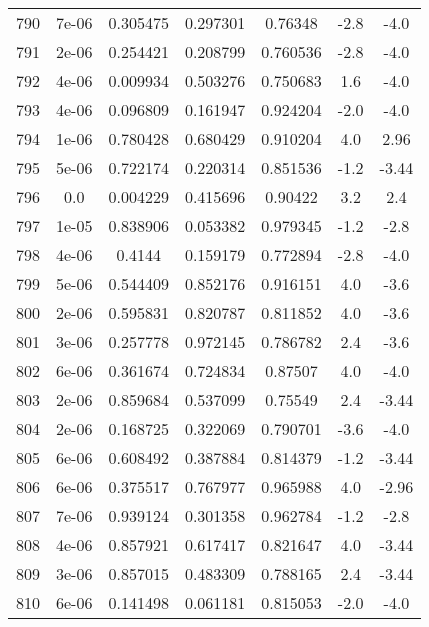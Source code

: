 \begin{table}
\begin{tabular}{c|c|c|c|c|c|c}
790 & 7e-06 & 0.305475 & 0.297301 & 0.76348 & -2.8 & -4.0\\
791 & 2e-06 & 0.254421 & 0.208799 & 0.760536 & -2.8 & -4.0\\
792 & 4e-06 & 0.009934 & 0.503276 & 0.750683 & 1.6 & -4.0\\
793 & 4e-06 & 0.096809 & 0.161947 & 0.924204 & -2.0 & -4.0\\
794 & 1e-06 & 0.780428 & 0.680429 & 0.910204 & 4.0 & 2.96\\
795 & 5e-06 & 0.722174 & 0.220314 & 0.851536 & -1.2 & -3.44\\
796 & 0.0 & 0.004229 & 0.415696 & 0.90422 & 3.2 & 2.4\\
797 & 1e-05 & 0.838906 & 0.053382 & 0.979345 & -1.2 & -2.8\\
798 & 4e-06 & 0.4144 & 0.159179 & 0.772894 & -2.8 & -4.0\\
799 & 5e-06 & 0.544409 & 0.852176 & 0.916151 & 4.0 & -3.6\\
800 & 2e-06 & 0.595831 & 0.820787 & 0.811852 & 4.0 & -3.6\\
801 & 3e-06 & 0.257778 & 0.972145 & 0.786782 & 2.4 & -3.6\\
802 & 6e-06 & 0.361674 & 0.724834 & 0.87507 & 4.0 & -4.0\\
803 & 2e-06 & 0.859684 & 0.537099 & 0.75549 & 2.4 & -3.44\\
804 & 2e-06 & 0.168725 & 0.322069 & 0.790701 & -3.6 & -4.0\\
805 & 6e-06 & 0.608492 & 0.387884 & 0.814379 & -1.2 & -3.44\\
806 & 6e-06 & 0.375517 & 0.767977 & 0.965988 & 4.0 & -2.96\\
807 & 7e-06 & 0.939124 & 0.301358 & 0.962784 & -1.2 & -2.8\\
808 & 4e-06 & 0.857921 & 0.617417 & 0.821647 & 4.0 & -3.44\\
809 & 3e-06 & 0.857015 & 0.483309 & 0.788165 & 2.4 & -3.44\\
810 & 6e-06 & 0.141498 & 0.061181 & 0.815053 & -2.0 & -4.0\\
\end{tabular}
\end{table}
\newpage
